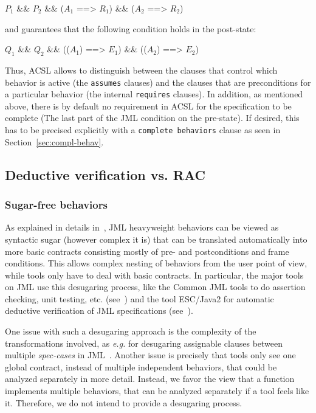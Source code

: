 \begin{listing-nonumber}
  $P_1$ && $P_2$ && ($A_1$ ==> $R_1$) && ($A_2$ ==> $R_2$)
\end{listing-nonumber}

\noindent
and guarantees that the following condition holds in the post-state:

\begin{listing-nonumber}
$Q_1$ && $Q_2$ && (\old($A_1$) ==> $E_1$) && (\old($A_2$) ==> $E_2$)
\end{listing-nonumber}

Thus, ACSL allows to distinguish between the clauses that control
which behavior is active (the \lstinline|assumes| clauses) and the
clauses that are preconditions for a particular behavior (the internal
\lstinline|requires| clauses). In addition, as mentioned above, there is
by default no requirement in ACSL for the specification to be complete (The
last part of the JML condition on the pre-state). If desired, this has
to be precised explicitly with a \lstinline+complete behaviors+ clause as
seen in Section~\ref{sec:compl-behav}.

\subsection{Deductive verification vs. RAC}

\subsubsection*{Sugar-free behaviors}

As explained in details in~\cite{raghavan00desugaring}, JML
heavyweight behaviors can be viewed as syntactic sugar (however
complex it is) that can be translated automatically into more basic
contracts consisting mostly of pre- and postconditions and frame
conditions.  This allows complex nesting of behaviors from the user
point of view, while tools only have to deal with basic contracts. In
particular, the major tools on JML use this desugaring process, like
the Common JML tools to do assertion checking, unit testing,
etc. (see~\cite{leavens00jml}) and the tool ESC/Java2 for
automatic deductive verification of JML specifications
(see~\cite{kiriny07implnotes}).

One issue with such a desugaring approach is the complexity of the
transformations involved, as \emph{e.g.} for desugaring assignable clauses
between multiple \textit{spec-cases} in
JML~\cite{raghavan00desugaring}.  Another issue is precisely that
tools only see one global contract, instead of multiple independent
behaviors, that could be analyzed separately in more detail.
Instead, we favor the view that a function implements multiple
behaviors, that can be analyzed separately if a tool feels like
it. Therefore, we do not intend to provide a desugaring process.

